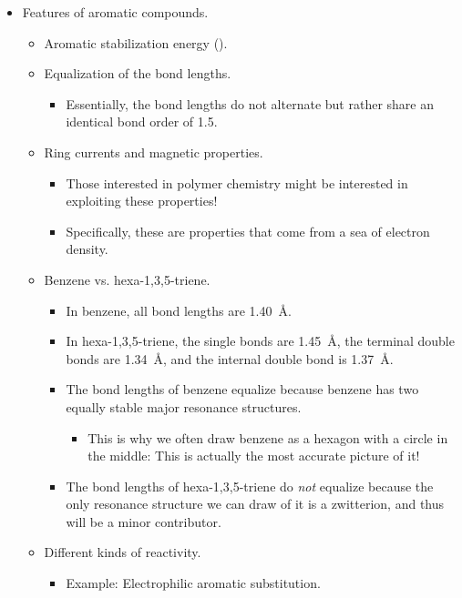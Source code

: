 \documentclass[../notes.tex]{subfiles}
\begin{document}
\begin{itemize}
\begin{itemize}
    \end{itemize}
    \item Features of aromatic compounds.
    \begin{itemize}
        \item Aromatic stabilization energy ().
        \item Equalization of the bond lengths.
        \begin{itemize}
            \item Essentially, the bond lengths do not alternate but rather share an identical bond order of 1.5.
        \end{itemize}
        \item Ring currents and magnetic properties.
        \begin{itemize}
            \item Those interested in polymer chemistry might be interested in exploiting these properties!
            \item Specifically, these are properties that come from a sea of electron density.
        \end{itemize}
        \item Benzene vs. hexa-1,3,5-triene.
        \begin{itemize}
            \item In benzene, all bond lengths are \SI{1.40}{\angstrom}.
            \item In hexa-1,3,5-triene, the single bonds are \SI{1.45}{\angstrom}, the terminal double bonds are \SI{1.34}{\angstrom}, and the internal double bond is \SI{1.37}{\angstrom}.
            \item The bond lengths of benzene equalize because benzene has two equally stable major resonance structures.
            \begin{itemize}
                \item This is why we often draw benzene as a hexagon with a circle in the middle: This is actually the most accurate picture of it!
            \end{itemize}
            \item The bond lengths of hexa-1,3,5-triene do \emph{not} equalize because the only resonance structure we can draw of it is a zwitterion, and thus will be a minor contributor.
        \end{itemize}
        \item Different kinds of reactivity.
        \begin{itemize}
            \item Example: Electrophilic aromatic substitution.

\end{itemize}
\end{itemize}
\end{itemize}
\end{document}
